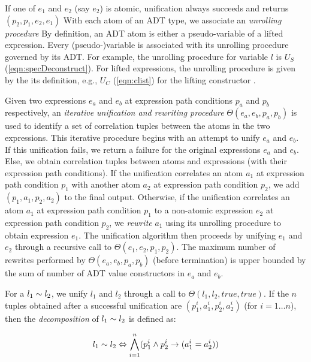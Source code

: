 If one of $e_1$ and $e_2$ (say $e_2$) is atomic,
unification always succeeds and returns $(p_2,p_1,e_2,e_1)$
With each atom of an ADT type, we associate an {\em unrolling procedure}
By definition, an ADT atom is either a pseudo-variable of a lifted expression.
Every (pseudo-)variable is associated with its unrolling procedure governed by its ADT.
For example, the unrolling procedure for  variable $l$ is $U_S$ (\cref{eqn:specDeconstruct}).
For lifted expressions, the unrolling procedure is given by the
its definition, e.g., $U_C$ (\cref{eqn:clist}) for the lifting constructor .

Given two expressions $e_a$ and $e_b$ at expression path conditions $p_a$ and $p_b$
respectively, an {\em iterative unification and rewriting procedure}
$\Theta(e_a,e_b,p_a,p_b)$ is used to identify a set of correlation tuples
between the atoms in the two expressions.
This iterative procedure begins with an attempt to unify $e_a$ and $e_b$.
If this unification fails, we return a failure for the original expressions $e_a$ and $e_b$.
Else, we obtain correlation tuples between atoms and expressions
(with their expression path conditions).
If the unification correlates an atom $a_1$ at expression path condition $p_1$
with another atom $a_2$ at expression path condition $p_2$, we add
$(p_1,a_1,p_2,a_2)$ to the final output.
Otherwise, if the unification correlates an atom $a_1$ at expression path condition $p_1$
to a non-atomic expression $e_2$ at expression path condition $p_2$,
we {\em rewrite} $a_1$ using its unrolling procedure to obtain expression $e_1$.
The unification algorithm then proceeds by unifying $e_1$ and $e_2$ through
a recursive call to $\Theta(e_1,e_2,p_1,p_2)$.
The maximum number of rewrites performed by $\Theta(e_a,e_b,p_a,p_b)$ (before termination)
is upper bounded by the sum of number of ADT value constructors in $e_a$ and $e_b$.

For a \recursiveRelation{} $l_1 \sim{} l_2$, we unify $l_1$ and $l_2$ through a
call to $\Theta(l_1,l_2,true,true)$.
If the $n$ tuples obtained after a successful unification are $(p_1^i,a_1^i,p_2^i,a_2^i)$
(for $i=1\ldots n$), then the {\em decomposition} of $l_1 \sim{} l_2$ is defined as:

\begin{equation}
\label{eqn:decompose}
l_1 \sim{} l_2 \Leftrightarrow \bigwedge \limits_{i=1}^n (p_1^i \land p_2^i \rightarrow (a_1^i = a_2^i))
\end{equation}

